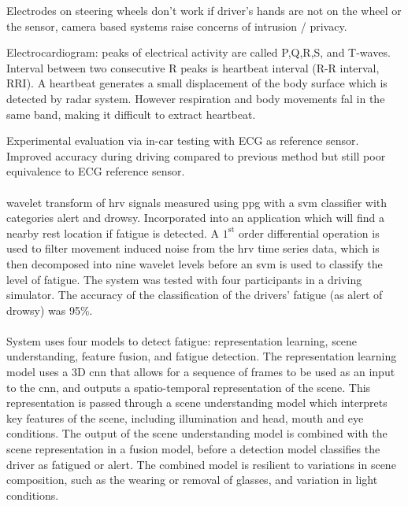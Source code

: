 \documentclass[11pt, parskip=half*,twoside=false]{scrbook}
\begin{document}
Electrodes on steering wheels don't work if driver's hands are not on the wheel or the sensor, camera based systems raise concerns of intrusion / privacy. 

Electrocardiogram: peaks of electrical activity are called P,Q,R,S, and T-waves. Interval between two consecutive R peaks is heartbeat interval (R-R interval, RRI). A heartbeat generates a small displacement of the body surface which is detected by radar system. However  respiration and body movements fal in the same band, making it difficult to extract heartbeat.

Experimental evaluation via in-car testing with ECG as reference sensor. Improved accuracy during driving compared to previous method but still poor equivalence to ECG reference sensor.

\paragraph{\citet{liDetectionDriverDrowsiness2013}} wavelet transform of \gls{hrv} signals measured using \gls{ppg} with a \gls{svm} classifier with categories alert and drowsy. Incorporated into an application which will find a nearby rest location if fatigue is detected. A $1^\text{st}$ order differential operation is used to filter movement induced noise from the  \gls{hrv} time series data, which is then decomposed into nine wavelet levels before an \gls{svm} is used to classify the level of fatigue. The system was tested with four participants in a driving simulator. The accuracy of the classification of the drivers' fatigue (as alert of drowsy) was 95\%.

\paragraph{\citet{yuDriverDrowsinessDetection2019}} System uses four models to detect fatigue: representation learning, scene understanding, feature fusion, and fatigue detection. The representation learning model uses a 3D \gls{cnn} that allows for a sequence of frames to be used as an input to the \gls{cnn}, and outputs a spatio-temporal representation of the scene. This representation is passed through a scene understanding model which interprets key features of the scene, including illumination and head, mouth and eye conditions. The output of the scene understanding model is combined with the scene representation in a fusion model, before a detection model classifies the driver as fatigued or alert. The combined model is resilient to variations in scene composition, such as the wearing or removal of glasses, and variation in light conditions. 
 
\end{document}
